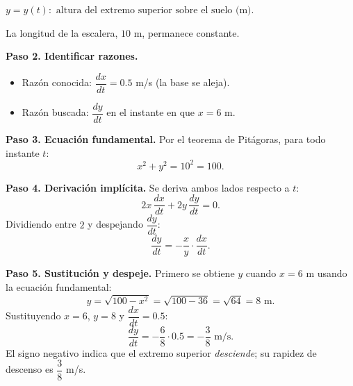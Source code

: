 \begin{example}
\begin{myproof}
$y = y(t): \text{ altura del extremo superior sobre el suelo (m)}.$


La longitud de la escalera, $10$ m, permanece constante.

\textbf{Paso 2. Identificar razones.}
\begin{itemize}
    \item Razón conocida: $\dfrac{dx}{dt} = 0.5$ m/s (la base se aleja).
    \item Razón buscada: $\dfrac{dy}{dt}$ en el instante en que $x = 6$ m.
\end{itemize}

\textbf{Paso 3. Ecuación fundamental.}
Por el teorema de Pitágoras, para todo instante $t$:
\[
x^2 + y^2 = 10^2 = 100.
\]

\textbf{Paso 4. Derivación implícita.}
Se deriva ambos lados respecto a $t$:
\[
2x\,\frac{dx}{dt} + 2y\,\frac{dy}{dt} = 0.
\]
Dividiendo entre $2$ y despejando $\dfrac{dy}{dt}$:
\[
\frac{dy}{dt} = -\frac{x}{y}\cdot\frac{dx}{dt}.
\]

\textbf{Paso 5. Sustitución y despeje.}
Primero se obtiene $y$ cuando $x = 6$ m usando la ecuación fundamental:
\[
y = \sqrt{100 - x^2} = \sqrt{100 - 36} = \sqrt{64} = 8 \text{ m}.
\]
Sustituyendo $x=6$, $y=8$ y $\dfrac{dx}{dt}=0.5$:
\[
\frac{dy}{dt} = -\frac{6}{8}\cdot 0.5 = \boxed{-\frac{3}{8} \text{ m/s.}}
\]
El signo negativo indica que el extremo superior \emph{desciende}; su
rapidez de descenso es $\dfrac{3}{8}$ m/s.
\end{myproof}
\end{example}


